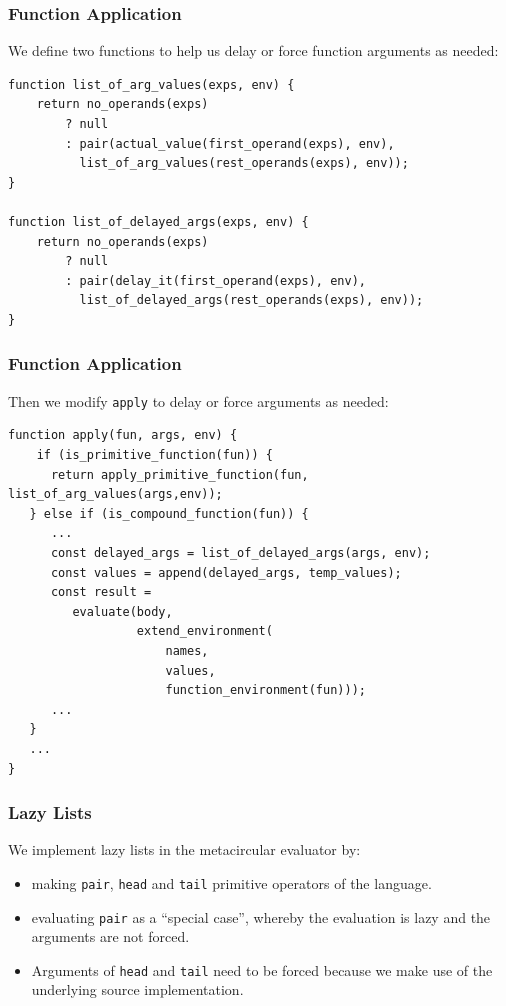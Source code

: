 \documentclass[12pt]{beamer}
\begin{document}
\begin{frame}[fragile]
\frametitle{Function Application}
We define two functions to help us delay or force function arguments as needed:
\begin{lstlisting}
function list_of_arg_values(exps, env) {
    return no_operands(exps)
        ? null
        : pair(actual_value(first_operand(exps), env),
          list_of_arg_values(rest_operands(exps), env));
}

function list_of_delayed_args(exps, env) {
    return no_operands(exps)
        ? null
        : pair(delay_it(first_operand(exps), env),
          list_of_delayed_args(rest_operands(exps), env));
}
\end{lstlisting}
\end{frame}

\begin{frame}[fragile]
\frametitle{Function Application}
Then we modify \texttt{apply} to delay or force arguments as needed:
\begin{lstlisting}
function apply(fun, args, env) {
    if (is_primitive_function(fun)) {
      return apply_primitive_function(fun, list_of_arg_values(args,env));
   } else if (is_compound_function(fun)) {
      ...
      const delayed_args = list_of_delayed_args(args, env);
      const values = append(delayed_args, temp_values);			   
      const result =
         evaluate(body,
                  extend_environment(
                      names,
                      values,
                      function_environment(fun)));
      ...
   }
   ...
}
\end{lstlisting}
\end{frame}

\begin{frame}[fragile]
\frametitle{Lazy Lists}
We implement lazy lists in the metacircular evaluator by:
\begin{itemize}
\item<1->making  \texttt{pair}, \texttt{head} and \texttt{tail} primitive operators of the language. 
\item<2->evaluating \texttt{pair} as a ``special case'', whereby the evaluation is lazy and the arguments are not forced.
\item<3->Arguments of \texttt{head} and \texttt{tail} need to be forced because we make use of the underlying source implementation.
\end{itemize}
\end{frame}
\end{document}
